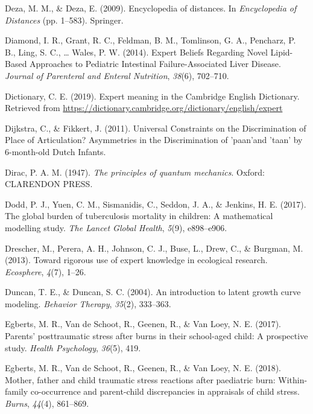 \documentclass[openright,titlepage,12pt,a4paper]{book}
\begin{document}
\leavevmode\hypertarget{ref-deza_encyclopedia_2009}{}%
Deza, M. M., \& Deza, E. (2009). Encyclopedia of distances. In \emph{Encyclopedia of Distances} (pp. 1--583). Springer.

\leavevmode\hypertarget{ref-diamond_expert_2014}{}%
Diamond, I. R., Grant, R. C., Feldman, B. M., Tomlinson, G. A., Pencharz, P. B., Ling, S. C., \ldots{} Wales, P. W. (2014). Expert Beliefs Regarding Novel Lipid-Based Approaches to Pediatric Intestinal Failure-Associated Liver Disease. \emph{Journal of Parenteral and Enteral Nutrition}, \emph{38}(6), 702--710.

\leavevmode\hypertarget{ref-cambridge_english_dictionary_expert_2019}{}%
Dictionary, C. E. (2019). Expert meaning in the Cambridge English Dictionary. Retrieved from \url{https://dictionary.cambridge.org/dictionary/english/expert}

\leavevmode\hypertarget{ref-dijkstra_universal_2011}{}%
Dijkstra, C., \& Fikkert, J. (2011). Universal Constraints on the Discrimination of Place of Articulation? Asymmetries in the Discrimination of 'paan'and 'taan' by 6-month-old Dutch Infants.

\leavevmode\hypertarget{ref-dirac_principles_1947}{}%
Dirac, P. A. M. (1947). \emph{The principles of quantum mechanics}. Oxford: CLARENDON PRESS.

\leavevmode\hypertarget{ref-dodd_global_2017}{}%
Dodd, P. J., Yuen, C. M., Sismanidis, C., Seddon, J. A., \& Jenkins, H. E. (2017). The global burden of tuberculosis mortality in children: A mathematical modelling study. \emph{The Lancet Global Health}, \emph{5}(9), e898--e906.

\leavevmode\hypertarget{ref-drescher_toward_2013}{}%
Drescher, M., Perera, A. H., Johnson, C. J., Buse, L., Drew, C., \& Burgman, M. (2013). Toward rigorous use of expert knowledge in ecological research. \emph{Ecosphere}, \emph{4}(7), 1--26.

\leavevmode\hypertarget{ref-duncan_introduction_2004}{}%
Duncan, T. E., \& Duncan, S. C. (2004). An introduction to latent growth curve modeling. \emph{Behavior Therapy}, \emph{35}(2), 333--363.

\leavevmode\hypertarget{ref-egberts_parents_2017}{}%
Egberts, M. R., Van de Schoot, R., Geenen, R., \& Van Loey, N. E. (2017). Parents' posttraumatic stress after burns in their school-aged child: A prospective study. \emph{Health Psychology}, \emph{36}(5), 419.

\leavevmode\hypertarget{ref-egberts_mother_2018}{}%
Egberts, M. R., Van de Schoot, R., Geenen, R., \& Van Loey, N. E. (2018). Mother, father and child traumatic stress reactions after paediatric burn: Within-family co-occurrence and parent-child discrepancies in appraisals of child stress. \emph{Burns}, \emph{44}(4), 861--869.
\end{document}
